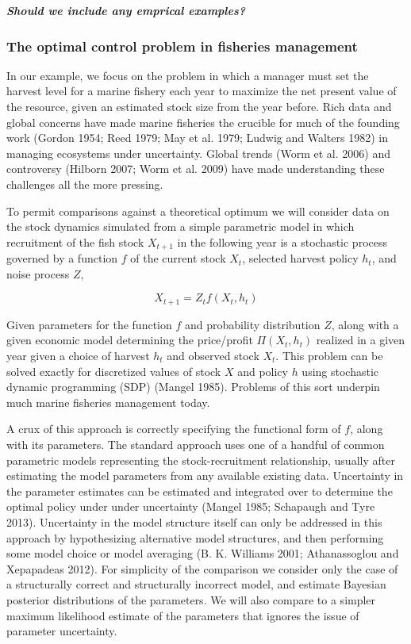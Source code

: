 \documentclass[author-year, review]{elsarticle} %
\begin{document}
\textbf{\emph{Should we include any emprical examples?}}

\subsubsection{The optimal control problem in fisheries management}

In our example, we focus on the problem in which a manager must set the
harvest level for a marine fishery each year to maximize the net present
value of the resource, given an estimated stock size from the year
before. Rich data and global concerns have made marine fisheries the
crucible for much of the founding work (Gordon 1954; Reed 1979; May et
al. 1979; Ludwig and Walters 1982) in managing ecosystems under
uncertainty. Global trends (Worm et al. 2006) and controversy (Hilborn
2007; Worm et al. 2009) have made understanding these challenges all the
more pressing.

To permit comparisons against a theoretical optimum we will consider
data on the stock dynamics simulated from a simple parametric model in
which recruitment of the fish stock $X_{t+1}$ in the following year is a
stochastic process governed by a function $f$ of the current stock
$X_t$, selected harvest policy $h_t$, and noise process $Z$,

\[X_{t+1} = Z_t f(X_t, h_t) \]

Given parameters for the function $f$ and probability distribution $Z$,
along with a given economic model determining the price/profit
$\Pi(X_t, h_t)$ realized in a given year given a choice of harvest $h_t$
and observed stock $X_t$. This problem can be solved exactly for
discretized values of stock $X$ and policy $h$ using stochastic dynamic
programming (SDP) (Mangel 1985). Problems of this sort underpin much
marine fisheries management today.

A crux of this approach is correctly specifying the functional form of
$f$, along with its parameters. The standard approach uses one of a
handful of common parametric models representing the stock-recruitment
relationship, usually after estimating the model parameters from any
available existing data. Uncertainty in the parameter estimates can be
estimated and integrated over to determine the optimal policy under
under uncertainty (Mangel 1985; Schapaugh and Tyre 2013). Uncertainty in
the model structure itself can only be addressed in this approach by
hypothesizing alternative model structures, and then performing some
model choice or model averaging (B. K. Williams 2001; Athanassoglou and
Xepapadeas 2012). For simplicity of the comparison we consider only the
case of a structurally correct and structurally incorrect model, and
estimate Bayesian posterior distributions of the parameters. We will
also compare to a simpler maximum likelihood estimate of the parameters
that ignores the issue of parameter uncertainty.
\end{document}
